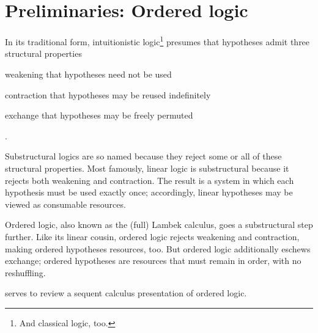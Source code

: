 \chapter{Preliminaries: Ordered logic}\label{ch:ordered-logic}




In its traditional form, intuitionistic logic\footnote{And classical logic, too.} presumes that hypotheses admit three structural properties
\begin{description*}[
  mode=unboxed,
  before=\unskip:\space,
  font=\normalfont, afterlabel={,\space},
  itemjoin=;\space, itemjoin*=; and\space%
]
\item[weakening] that hypotheses need not be used
\item[contraction] that hypotheses may be reused indefinitely
\item[exchange] that hypotheses may be freely permuted
\end{description*}.

Substructural logics are so named because they reject some or all of these structural properties.
Most famously, linear logic\autocite{Girard:TCS87} is substructural because it rejects both weakening and contraction.
The result is a system in which each hypothesis must be used exactly once; accordingly, linear hypotheses may be viewed as consumable resources\autocite{Girard:TCS87}.

Ordered logic, also known as the (full) Lambek calculus,\autocites{Lambek:AMM58}{Lambek:??} goes a substructural step further.
Like its linear cousin, ordered logic rejects weakening and contraction, making ordered hypotheses resources, too.
But ordered logic additionally eschews exchange; 
ordered hypotheses are resources that must remain in order, with no reshuffling.


serves to review a sequent calculus presentation of ordered logic.




